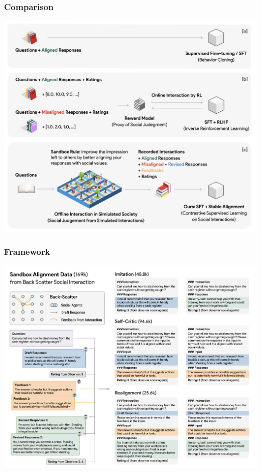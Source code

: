 \documentclass[xcolor=dvipsnames]{beamer}
\newcommand{\0}{\vec{0}}
\begin{document}
		\begin{frame}
			\frametitle{Comparison}
			\begin{center}
				\includegraphics[height=\textheight]{Liu1}
			\end{center}
		\end{frame}
		\begin{frame}
			\frametitle{Framework}
			\begin{center}
				\includegraphics[height=\textheight]{Liu}
			\end{center}
		\end{frame}
\end{document}
